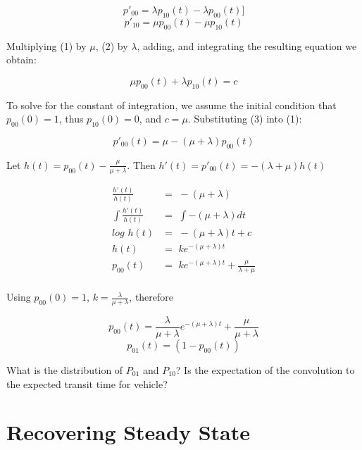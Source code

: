 \documentclass[]{article}
\begin{document}
\begin{equation}
p'_{00} = \lambda p_{10}(t) - \lambda p_{00}(t) ]
\end{equation}
\begin{equation}
p'_{10} = \mu p_{00}(t) - \mu p_{10}(t)
\end{equation}

Multiplying (1) by $\mu$, (2) by $\lambda$, adding, and integrating the resulting equation we obtain:

\begin{equation}
\mu p_{00}(t) + \lambda p_{10}(t) = c
\end{equation}

To solve for the constant of integration, we assume the initial condition that $p_{00}(0) = 1$, thus $p_{10}(0) = 0$, and $c = \mu$. Substituting (3) into (1):

\begin{equation}
p'_{00}(t) = \mu - (\mu + \lambda) p_00(t)
\end{equation}

Let $h(t) = p_00(t) - \frac{\mu}{\mu + \lambda}$. Then $h'(t) = p'_{00}(t) = -(\lambda + \mu)h(t)$

\begin{align}
\frac{h'(t)}{h(t)} &=\,\, -(\mu + \lambda) \\
\int \frac{h'(t)}{h(t)} &=\,\, \int -(\mu + \lambda) dt \\
log \,\, h(t) &=\,\, -(\mu + \lambda)t + c \\
h(t) &=\,\, k e^{-(\mu + \lambda)t} \\
p_{00}(t) &=\,\, k e^{-(\mu + \lambda)t} + \frac{\mu}{\lambda + \mu} \\
\end{align}

Using $p_{00}(0) = 1$, $k = \frac{\lambda}{\mu + \lambda}$, therefore

\begin{equation}
p_{00}(t)  = \frac{\lambda}{\mu+\lambda} e^{-(\mu + \lambda)t} + \frac{\mu}{\mu + \lambda}
\end{equation}
\begin{equation}
p_{01}(t) = (1 - p_{00}(t))
\end{equation}

What is the distribution of $P_{01}$ and $P_{10}$? Is the expectation of the convolution to the expected transit time for vehicle?

\section{Recovering Steady State}
\end{document}
